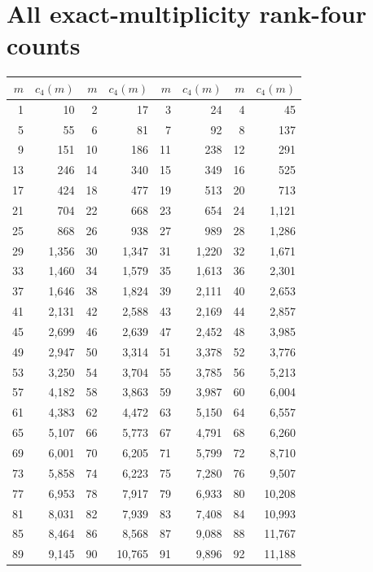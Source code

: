 \documentclass[11pt,a4paper]{article}
\theoremstyle{definition}\newtheorem{definition}[theorem]{Definition}\newtheorem{remark}[theorem]{Remark}
\begin{document}
\section{All exact-multiplicity rank-four counts}
\begin{longtable}{rr@{\hspace{1.1cm}}rr@{\hspace{1.1cm}}rr@{\hspace{1.1cm}}rr}
\toprule $m$ & $c_4(m)$ & $m$ & $c_4(m)$ & $m$ & $c_4(m)$ & $m$ & $c_4(m)$\\\midrule\endhead
1 & 10 & 2 & 17 & 3 & 24 & 4 & 45\\
5 & 55 & 6 & 81 & 7 & 92 & 8 & 137\\
9 & 151 & 10 & 186 & 11 & 238 & 12 & 291\\
13 & 246 & 14 & 340 & 15 & 349 & 16 & 525\\
17 & 424 & 18 & 477 & 19 & 513 & 20 & 713\\
21 & 704 & 22 & 668 & 23 & 654 & 24 & 1,121\\
25 & 868 & 26 & 938 & 27 & 989 & 28 & 1,286\\
29 & 1,356 & 30 & 1,347 & 31 & 1,220 & 32 & 1,671\\
33 & 1,460 & 34 & 1,579 & 35 & 1,613 & 36 & 2,301\\
37 & 1,646 & 38 & 1,824 & 39 & 2,111 & 40 & 2,653\\
41 & 2,131 & 42 & 2,588 & 43 & 2,169 & 44 & 2,857\\
45 & 2,699 & 46 & 2,639 & 47 & 2,452 & 48 & 3,985\\
49 & 2,947 & 50 & 3,314 & 51 & 3,378 & 52 & 3,776\\
53 & 3,250 & 54 & 3,704 & 55 & 3,785 & 56 & 5,213\\
57 & 4,182 & 58 & 3,863 & 59 & 3,987 & 60 & 6,004\\
61 & 4,383 & 62 & 4,472 & 63 & 5,150 & 64 & 6,557\\
65 & 5,107 & 66 & 5,773 & 67 & 4,791 & 68 & 6,260\\
69 & 6,001 & 70 & 6,205 & 71 & 5,799 & 72 & 8,710\\
73 & 5,858 & 74 & 6,223 & 75 & 7,280 & 76 & 9,507\\
77 & 6,953 & 78 & 7,917 & 79 & 6,933 & 80 & 10,208\\
81 & 8,031 & 82 & 7,939 & 83 & 7,408 & 84 & 10,993\\
85 & 8,464 & 86 & 8,568 & 87 & 9,088 & 88 & 11,767\\
89 & 9,145 & 90 & 10,765 & 91 & 9,896 & 92 & 11,188\\

\end{longtable}
\end{document}
